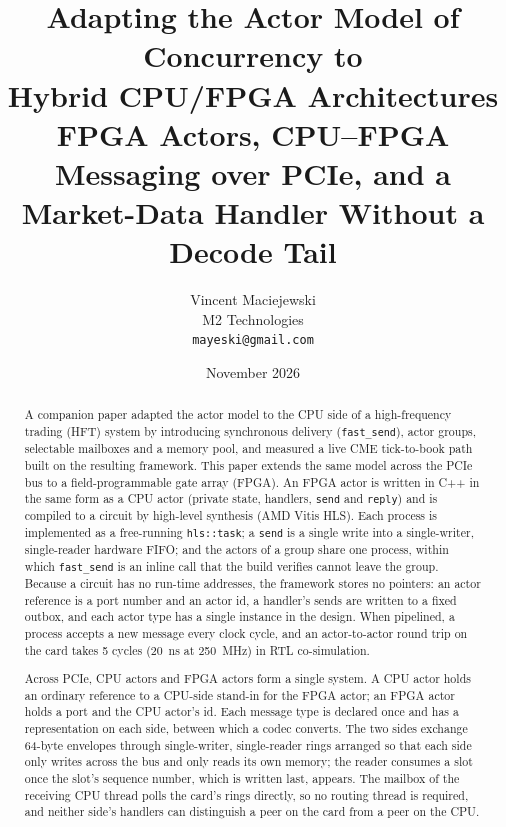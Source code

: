 \documentclass[11pt]{article}
\title{\textbf{Adapting the Actor Model of Concurrency to\\
Hybrid CPU/FPGA Architectures}\\
\large FPGA Actors, CPU--FPGA Messaging over PCIe, and a Market-Data Handler
Without a Decode Tail}
\author{%
  Vincent Maciejewski\\
  \small M2 Technologies\\
  \small \texttt{mayeski@gmail.com}
}
\date{November 2026}
\newcommand{\fs}{\texttt{fast\_send}}
\newcommand{\snd}{\texttt{send}}
\begin{document}
\maketitle

\begin{abstract}
A companion paper adapted the actor model to the CPU side of a high-frequency
trading (HFT) system by introducing synchronous delivery (\fs{}), actor groups,
selectable mailboxes and a memory pool, and measured a live CME tick-to-book
path built on the resulting framework. This paper extends the same model across
the PCIe bus to a field-programmable gate array (FPGA). An FPGA actor is written
in C++ in the same form as a CPU actor (private state, handlers, \snd{} and
\texttt{reply}) and is compiled to a circuit by high-level synthesis (AMD Vitis
HLS). Each process is implemented as a free-running \texttt{hls::task}; a
\snd{} is a single write into a single-writer, single-reader hardware FIFO; and
the actors of a group share one process, within which \fs{} is an inline call
that the build verifies cannot leave the group. Because a circuit has no
run-time addresses, the framework stores no pointers: an actor reference is a
port number and an actor id, a handler's sends are written to a fixed outbox,
and each actor type has a single instance in the design. When pipelined, a
process accepts a new message every clock cycle, and an actor-to-actor round
trip on the card takes 5 cycles (20~ns at 250~MHz) in RTL co-simulation.

Across PCIe, CPU actors and FPGA actors form a single system. A CPU actor holds
an ordinary reference to a CPU-side stand-in for the FPGA actor; an FPGA actor
holds a port and the CPU actor's id. Each message type is declared once and has
a representation on each side, between which a codec converts. The two sides
exchange 64-byte envelopes through single-writer, single-reader rings arranged
so that each side only writes across the bus and only reads its own memory; the
reader consumes a slot once the slot's sequence number, which is written last,
appears. The mailbox of the receiving CPU thread polls the card's rings
directly, so no routing thread is required, and neither side's handlers can
distinguish a peer on the card from a peer on the CPU.


\end{abstract}
\end{document}

